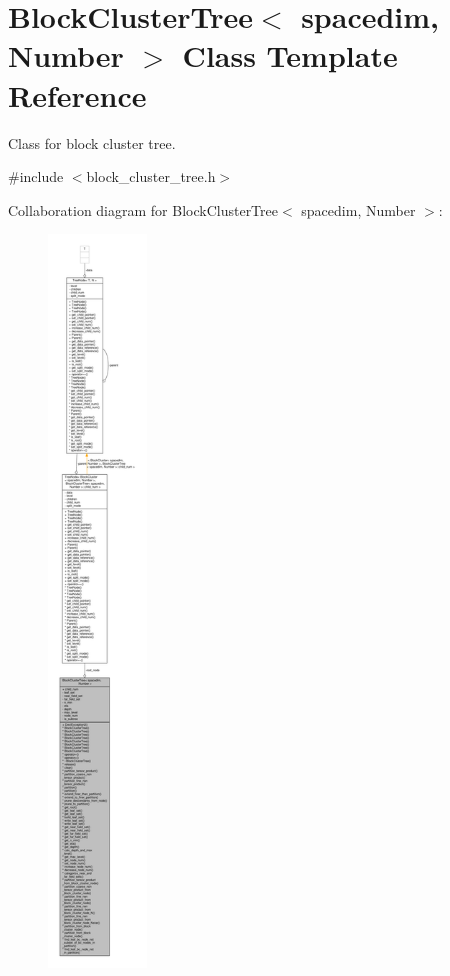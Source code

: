 \hypertarget{classBlockClusterTree}{}\section{Block\+Cluster\+Tree$<$ spacedim, Number $>$ Class Template Reference}
\label{classBlockClusterTree}


Class for block cluster tree.  




{\ttfamily \#include $<$block\+\_\+cluster\+\_\+tree.\+h$>$}



Collaboration diagram for Block\+Cluster\+Tree$<$ spacedim, Number $>$\+:\nopagebreak
\begin{figure}[H]
\begin{center}
\leavevmode
\includegraphics[height=550pt]{classBlockClusterTree__coll__graph}
\end{center}
\end{figure}
